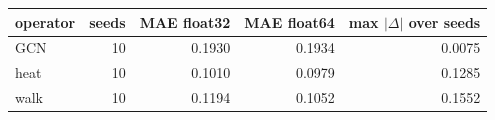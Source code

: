 \begin{tabular}{@{}lrrrr@{}}
\toprule
operator & seeds & MAE float32 & MAE float64 & max $|\Delta|$ over seeds \\
\midrule
GCN & 10 & 0.1930 & 0.1934 & 0.0075 \\
heat & 10 & 0.1010 & 0.0979 & 0.1285 \\
walk & 10 & 0.1194 & 0.1052 & 0.1552 \\
\bottomrule
\end{tabular}
